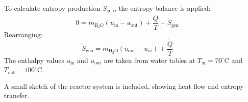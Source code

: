 To calculate entropy production \( \dot{S}_{\text{gen}} \), the entropy balance is applied:  
\[
0 = \dot{m}_{\text{H}_2\text{O}} (u_{\text{in}} - u_{\text{out}}) + \frac{\dot{Q}}{T} + \dot{S}_{\text{gen}}
\]  
Rearranging:  
\[
\dot{S}_{\text{gen}} = \dot{m}_{\text{H}_2\text{O}} (u_{\text{out}} - u_{\text{in}}) + \frac{\dot{Q}}{T}
\]  
The enthalpy values \( u_{\text{in}} \) and \( u_{\text{out}} \) are taken from water tables at \( T_{\text{in}} = 70^\circ\text{C} \) and \( T_{\text{out}} = 100^\circ\text{C} \).  

A small sketch of the reactor system is included, showing heat flow and entropy transfer.